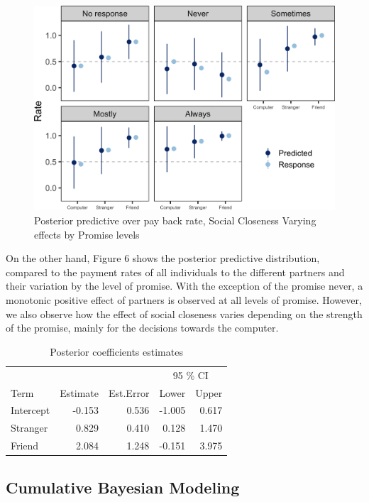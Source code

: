 \documentclass[12pt,]{article}
\begin{document}
\begin{figure}

{\centering \includegraphics[width=0.8\linewidth]{article_english_files/figure-latex/fig6-1} 

}

\caption{Posterior predictive over pay back rate, Social Closeness Varying effects by Promise levels}\label{fig:fig6}
\end{figure}

On the other hand, Figure 6 shows the posterior predictive distribution,
compared to the payment rates of all individuals to the different
partners and their variation by the level of promise. With the exception
of the promise never, a monotonic positive effect of partners is
observed at all levels of promise. However, we also observe how the
effect of social closeness varies depending on the strength of the
promise, mainly for the decisions towards the computer.

\begin{table}[!h]

\caption{\label{tab:tabla}Posterior coefficients estimates}
\centering
\begin{tabular}{lrrrr}
\toprule
\multicolumn{1}{c}{ } & \multicolumn{2}{c}{ } & \multicolumn{2}{c}{95 \% CI} \\
\cmidrule(l{3pt}r{3pt}){4-5}
Term & Estimate & Est.Error & Lower & Upper\\
\midrule
Intercept & -0.153 & 0.536 & -1.005 & 0.617\\
Stranger & 0.829 & 0.410 & 0.128 & 1.470\\
Friend & 2.084 & 1.248 & -0.151 & 3.975\\
\bottomrule
\end{tabular}
\end{table}

\hypertarget{cumulative-bayesian-modeling}{%
\subsection{Cumulative Bayesian
Modeling}\label{cumulative-bayesian-modeling}}
\end{document}
